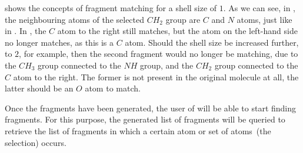  shows the concepts of fragment matching for a shell size of $1$. As we can see, in , the neighbouring atoms of the selected $CH_{2}$ group are $C$ and $N$ atoms, just like in . In , the $C$ atom to the right still matches, but the atom on the left-hand side no longer matches, as this is a $C$ atom. Should the shell size be increased further, to $2$, for example, then the second fragment would no longer be matching, due to the $CH_{3}$ group connected to the $NH$ group, and the $CH_{2}$ group connected to the $C$ atom to the right. The former is not present in the original molecule at all, the latter should be an $O$ atom to match.

Once the fragments have been generated, the user of \oframp{} will be able to start finding fragments. For this purpose, the generated list of fragments will be queried to retrieve the list of fragments in which a certain atom or set of atoms~(the selection) occurs.
